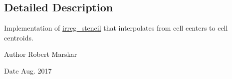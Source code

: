 \subsection{Detailed Description}
Implementation of \hyperlink{classirreg__stencil}{irreg\+\_\+stencil} that interpolates from cell centers to cell centroids. 

\begin{DoxyAuthor}{Author}
Robert Marskar 
\end{DoxyAuthor}
\begin{DoxyDate}{Date}
Aug. 2017 
\end{DoxyDate}
